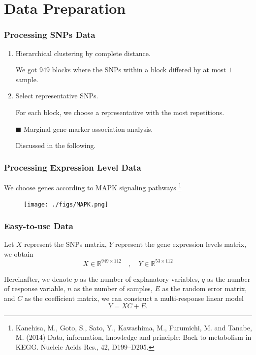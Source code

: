\section{Data Preparation}
\begin{frame}
    \sectionpage
\end{frame}

\begin{frame}
    \frametitle{Processing SNPs Data}

    \begin{enumerate}
        \item Hierarchical clustering by complete distance.

        We got $949$ blocks where the SNPs within a block differed by at most $1$ sample. 

        \item Select representative SNPs. 
        
        For each block, we choose a representative with the most repetitions. 

        \item[$\blacksquare$] Marginal gene-marker association analysis. 
        
        Discussed in the following. 
    \end{enumerate}
\end{frame}

\begin{frame}
    \frametitle{Processing Expression Level Data}

    We choose genes according to MAPK signaling pathways \footnote[2]{Kanehisa, M., Goto, S., Sato, Y., Kawashima, M., Furumichi, M. and Tanabe, M. (2014) Data, information, knowledge and principle: Back to metabolism in KEGG. Nucleic Acids Res., 42, D199–D205.}

    \begin{figure}[h]
        \centering
        \texttt{[image: ./figs/MAPK.png]}
    \end{figure}
\end{frame}

\begin{frame}\frametitle{Easy-to-use Data}
    Let $X$ represent the SNPs matrix, $Y$ represent the gene expression levels matrix, we obtain
    \begin{equation*}
        X\in\mathbb{R}^{949\times112} \quad,\quad Y\in\mathbb{R}^{53\times112}
    \end{equation*}

    Hereinafter, we denote $p$ as the number of explanatory variables, $q$ as the number of response variable, $n$ as the number of samples, $E$ as the random error matrix, and $C$ as the coefficient matrix, we can construct a multi-response linear model
    \begin{equation*}
        Y = XC + E. 
    \end{equation*}
    
\end{frame}



